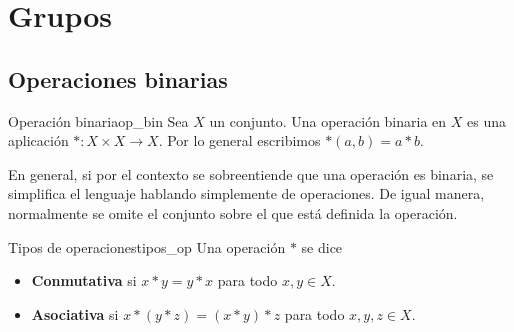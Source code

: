 \chapter{Grupos}

\section{Operaciones binarias}

\begin{definition}{Operación binaria}{op_bin}
    Sea \(X\) un conjunto. Una operación binaria en \(X\) es una aplicación \(*:X\times X\to X\). Por lo general escribimos \( * (a,b) = a * b\).
\end{definition}

\begin{remark}
    En general, si por el contexto se sobreentiende que una operación es binaria, se simplifica el lenguaje hablando simplemente de operaciones. De igual manera, normalmente se omite el conjunto sobre el que está definida la operación.
\end{remark}

\begin{definition}{Tipos de operaciones}{tipos_op}
    Una operación $*$ se dice
    \begin{itemize}
        \item \textbf{Conmutativa} si $x * y = y * x$ para todo $x,y\in X$.
        \item \textbf{Asociativa} si $x * (y * z) = (x * y) * z$ para todo $x,y,z \in X$.
    \end{itemize}
\end{definition}

